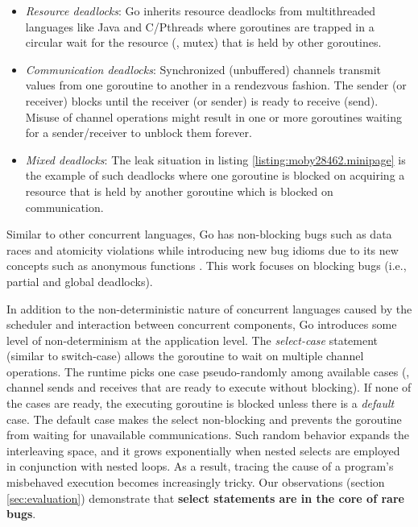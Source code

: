 \begin{itemize}
  \item \textit{Resource deadlocks}: Go inherits resource deadlocks from multithreaded languages like Java and C/Pthreads where goroutines are trapped in a circular wait for the resource (\eg, mutex) that is held by other goroutines.
  \item \textit{Communication deadlocks}: Synchronized (unbuffered) channels transmit values from one goroutine to another in a rendezvous fashion. The sender (or receiver) blocks until the receiver (or sender) is ready to receive (send). Misuse of channel operations might result in one or more goroutines waiting for a sender/receiver to unblock them forever.
  \item \textit{Mixed deadlocks}: The leak situation in listing \ref{listing:moby28462.minipage} is the example of such deadlocks where one goroutine is blocked on acquiring a resource that is held by another goroutine which is blocked on communication.
\end{itemize}

Similar to other concurrent languages, Go has non-blocking bugs such as data races and atomicity violations while introducing new bug idioms due to its new concepts such as anonymous functions \cite{tu-concurrentBugs-asplos19}.
%
This work focuses on blocking bugs (i.e., partial and global deadlocks).

In addition to the non-deterministic nature of concurrent languages caused by the scheduler and interaction between concurrent components, Go introduces some level of non-determinism at the application level.
%
The \textit{select-case} statement (similar to switch-case) allows the goroutine to wait on multiple channel operations.
%
The runtime picks one case pseudo-randomly among available cases (\ie, channel sends and receives that are ready to execute without blocking).
%
If none of the cases are ready, the executing goroutine is blocked unless there is a \textit{default} case.
%
The default case makes the select non-blocking and prevents the goroutine from waiting for unavailable communications.
%
Such random behavior expands the interleaving space, and it grows exponentially when nested selects are employed in conjunction with nested loops.
%
As a result, tracing the cause of a program's misbehaved execution becomes increasingly tricky.
%
Our observations (section \ref{sec:evaluation}) demonstrate that \textbf{select statements are in the core of rare bugs}.



